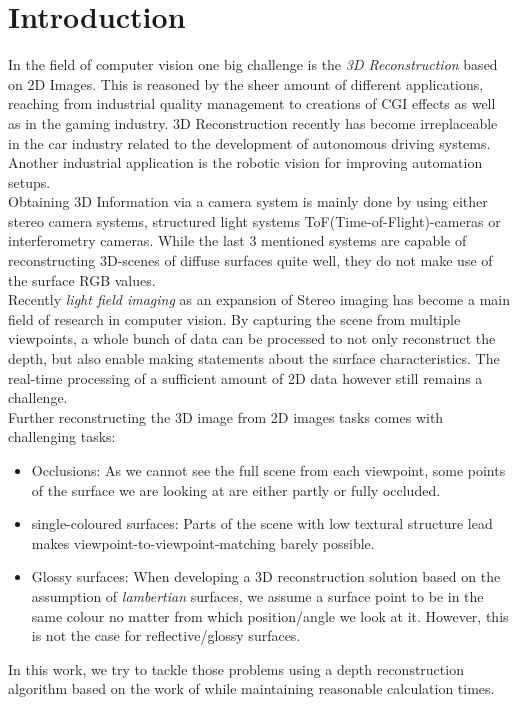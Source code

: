 \documentclass  [
  paper    = a4,
  BCOR     = 10mm,
  twoside,
  fontsize = 12pt,
  fleqn,
  toc      = bibnumbered,
  toc      = listofnumbered,
  numbers  = noendperiod,
  headings = normal,
  listof   = leveldown,
  version  = 3.03
]                                       {scrreprt}
\begin{document}
  

  \tableofcontents


\chapter{Introduction}
In the field of computer vision one big challenge is the \textit{3D Reconstruction} based on 2D Images. This is reasoned by the sheer amount of different applications, reaching from industrial quality management to creations of CGI effects as well as in the gaming industry. 3D Reconstruction recently has become irreplaceable in the car industry related to the development of autonomous driving systems. Another industrial application is the robotic vision for improving automation setups.\\

Obtaining 3D Information via a camera system is mainly done by using either stereo camera systems, structured light systems ToF(Time-of-Flight)-cameras or interferometry cameras. While the last 3 mentioned systems are capable of reconstructing 3D-scenes of diffuse surfaces quite well, they do not make use of the surface RGB values.\\
Recently \textit{light field imaging} as an expansion of Stereo imaging has become a main field of research in computer vision. By capturing the scene from multiple viewpoints, a whole bunch of data can be processed to not only reconstruct the depth, but also enable making statements about the surface characteristics. The real-time processing of a sufficient amount of 2D data however still remains a challenge. \\
Further reconstructing the 3D image from 2D images tasks comes with challenging tasks:
\begin{itemize}
	\item Occlusions: As we cannot see the full scene from each viewpoint, some points of the surface we are looking at are either partly or fully occluded.
	\item single-coloured surfaces: Parts of the scene with low textural structure lead makes viewpoint-to-viewpoint-matching barely possible.
	\item Glossy surfaces: When developing a 3D reconstruction solution based on the assumption of \textit{lambertian} surfaces, we assume a surface point to be in the same colour no matter from which position/angle we look at it. However,  this is not the case for reflective/glossy surfaces.
\end{itemize}
In this work, we try to tackle those problems using a depth reconstruction algorithm based on the work of \cite{wanner2014orientation} while maintaining reasonable calculation times.
\end{document}
